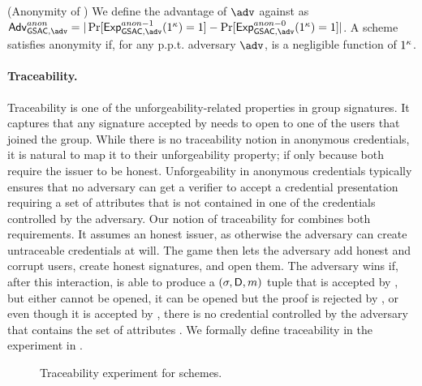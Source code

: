 \begin{definition}{(Anonymity of \GSAC)}
  \label{def:anonymity-gsac}
  We define the advantage \AdvGSACAnon of $\adv$ against \ExpGSACAnonb as
  $\AdvGSACAnon=|\Pr\lbrack\ExpGSACAnono(1^\secpar)=1\rbrack-
  \Pr\lbrack\ExpGSACAnonz(1^\secpar)=1\rbrack|$.
  A \GSAC scheme satisfies anonymity if, for any p.p.t. adversary $\adv$,
  \AdvAnon is a negligible function of $1^\kappa$.
\end{definition}

\paragraph{Traceability.} %
Traceability is one of the unforgeability-related properties in group
signatures. It captures that any signature accepted by \Verify needs to open
to one of the users that joined the group. While there is no traceability notion
in anonymous credentials, it is natural to map it to their unforgeability
property; if only because both require the issuer to be honest. Unforgeability
in anonymous credentials typically ensures that no adversary can get a verifier
to accept a credential presentation requiring a set of attributes that is not
contained in one of the credentials controlled by the adversary.
%
Our notion of traceability for \GSAC combines both requirements. It assumes an
honest issuer, as otherwise the adversary can create untraceable credentials at
will. The game then lets the adversary add honest and corrupt users, create
honest signatures, and open them. The adversary wins if, after this interaction,
is able to produce a $(\sigma,\mathsf{D},m)$ tuple that is accepted by \Verify,
but either cannot be opened, it can be opened but the proof is rejected by
\Judge, or even though it is accepted by \Judge, there is no credential
controlled by the adversary that contains the set of attributes \DAttrs. We
formally define traceability in the \ExpTrace experiment in
.

\begin{figure}[htp!]
  \caption{Traceability experiment for \GSAC schemes.}
  \label{fig:exp-gsac-trace}
\end{figure}

